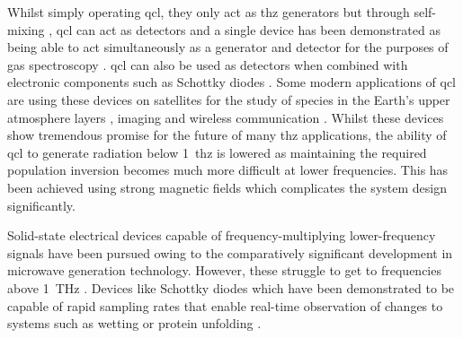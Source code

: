 Whilst simply operating \acrshort{qcl}, they only act as \acrshort{thz} generators but through self\nobreakdash-mixing \DIFdelbegin \DIFdel{~}\DIFdelend \cite{Keeley2017}, \acrshort{qcl} can act as detectors and a single device has been demonstrated as being able to act simultaneously as a generator and detector for the purposes of gas spectroscopy \DIFdelbegin \DIFdel{~}\DIFdelend \cite{Linfield2018}. \acrshort{qcl} can also be used as detectors when combined with electronic components such as Schottky diodes \DIFdelbegin \DIFdel{~}\DIFdelend \cite{Wanke2010}.
Some modern applications of \acrshort{qcl} are using these devices on satellites for the study of species in the Earth's upper atmosphere layers \DIFdelbegin \DIFdel{~}\DIFdelend \cite{Swinyard2016}, imaging \DIFdelbegin \DIFdel{~}\DIFdelend \cite{Dean2014} and wireless communication \DIFdelbegin \DIFdel{~}\DIFdelend \cite{Chen2011}. Whilst these devices show tremendous promise for the future of many \acrshort{thz} applications, the ability of \acrshort{qcl} to generate radiation below \SI{1}{\acrshort{thz}} is lowered as maintaining the required population inversion becomes much more difficult at lower frequencies. This has been achieved using strong magnetic fields \DIFdelbegin \DIFdel{~}\DIFdelend \cite{Wade2008} which complicates the system design significantly.

Solid\nobreakdash-state electrical devices capable of frequency\nobreakdash-multiplying lower\nobreakdash-frequency signals have been pursued owing to the comparatively significant development in microwave generation technology. However, these struggle to get to frequencies above \SI{1}{THz} \DIFdelbegin \DIFdel{~}\DIFdelend \cite{Kinev2021}. Devices like Schottky diodes which have been demonstrated to be capable of rapid sampling rates that enable real\nobreakdash-time observation of changes to systems such as wetting or protein unfolding \DIFdelbegin \DIFdel{~}\DIFdelend \cite{Rettich2015}.

